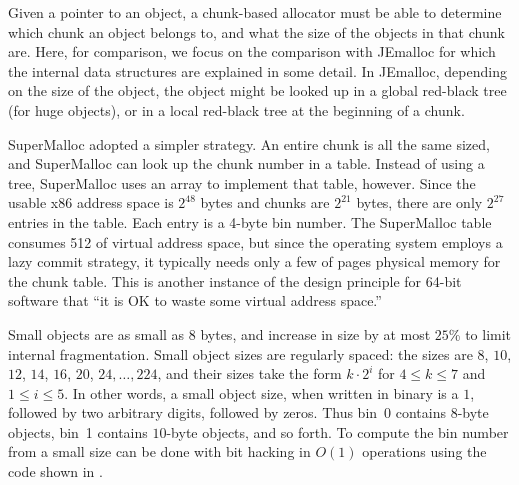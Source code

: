 \documentclass[natbib,sort&compress]{sigplanconf}
\begin{document}
Given a pointer to an object, a chunk-based allocator must be able to
determine which chunk an object belongs to, and what the size of the
objects in that chunk are.  Here, for comparison, we focus on the
comparison with JEmalloc for which the internal data structures are
explained in some detail.  In JEmalloc, depending on the size of the
object, the object might be looked up in a global red-black tree (for
huge objects), or in a local red-black tree at the beginning of a
chunk.

SuperMalloc adopted a simpler strategy.  An entire chunk is all the
same sized, and SuperMalloc can look up the chunk number in a table.
Instead of using a tree, SuperMalloc uses an array to implement that
table, however.  Since the usable x86 address space is $2^{48}$ bytes
and chunks are $2^{21}$ bytes, there are only $2^{27}$ entries in the
table.  Each entry is a 4-byte bin number.  The SuperMalloc table
consumes \unit{512}\mebi\byte{} of virtual address space, but since
the operating system employs a lazy commit strategy, it typically needs
only a few of pages physical memory for the chunk table.  This is
another instance of the design principle for 64-bit software that ``it
is OK to waste some virtual address space.''


Small objects are as small as 8 bytes, and increase in size by at most
$25$\% to limit internal fragmentation.  Small object sizes are
regularly spaced: the sizes are $8$, $10$, $12$, $14$, $16$, $20$,
$24, \ldots, 224$, and their sizes take the form $k\cdot2^i$ for
$4\leq k \leq 7$ and $1\leq i \leq 5$.  In other words, a small object
size, when written in binary is a $1$, followed by two arbitrary
digits, followed by zeros.  Thus bin~$0$ contains $8$-byte objects,
bin~1 contains $10$-byte objects, and so forth.  To compute the bin
number from a small size can be done with bit hacking in $O(1)$
operations using the code shown in .
\end{document}

